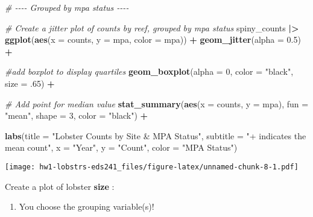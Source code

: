 \documentclass[
]{article}
\newenvironment{Shaded}{\begin{snugshade}}{\end{snugshade}}
\newcommand{\AttributeTok}[1]{\textcolor[rgb]{0.13,0.29,0.53}{#1}}
\newcommand{\CommentTok}[1]{\textcolor[rgb]{0.56,0.35,0.01}{\textit{#1}}}
\newcommand{\DecValTok}[1]{\textcolor[rgb]{0.00,0.00,0.81}{#1}}
\newcommand{\FloatTok}[1]{\textcolor[rgb]{0.00,0.00,0.81}{#1}}
\newcommand{\FunctionTok}[1]{\textcolor[rgb]{0.13,0.29,0.53}{\textbf{#1}}}
\newcommand{\NormalTok}[1]{#1}
\newcommand{\SpecialCharTok}[1]{\textcolor[rgb]{0.81,0.36,0.00}{\textbf{#1}}}
\newcommand{\StringTok}[1]{\textcolor[rgb]{0.31,0.60,0.02}{#1}}
\providecommand{\tightlist}{%
  \setlength{\itemsep}{0pt}\setlength{\parskip}{0pt}}
\begin{document}
\begin{Shaded}
\begin{Highlighting}[]
\CommentTok{\# {-}{-}{-}{-} Grouped by mpa status {-}{-}{-}{-}}

\CommentTok{\# Create a jitter plot of counts by reef, grouped by mpa status}
\NormalTok{spiny\_counts }\SpecialCharTok{|\textgreater{}}
\FunctionTok{ggplot}\NormalTok{(}\FunctionTok{aes}\NormalTok{(}\AttributeTok{x =}\NormalTok{ counts, }\AttributeTok{y =}\NormalTok{ mpa, }\AttributeTok{color =}\NormalTok{ mpa)) }\SpecialCharTok{+}
  \FunctionTok{geom\_jitter}\NormalTok{(}\AttributeTok{alpha =} \FloatTok{0.5}\NormalTok{) }\SpecialCharTok{+} 
    
    \CommentTok{\#add boxplot to display quartiles}
    \FunctionTok{geom\_boxplot}\NormalTok{(}\AttributeTok{alpha =} \DecValTok{0}\NormalTok{, }\AttributeTok{color =} \StringTok{"black"}\NormalTok{, }\AttributeTok{size =}\NormalTok{ .}\DecValTok{65}\NormalTok{) }\SpecialCharTok{+}
    
    \CommentTok{\# Add point for median value}
    \FunctionTok{stat\_summary}\NormalTok{(}\FunctionTok{aes}\NormalTok{(}\AttributeTok{x =}\NormalTok{ counts, }\AttributeTok{y =}\NormalTok{ mpa),}
                 \AttributeTok{fun =} \StringTok{"mean"}\NormalTok{,}
                 \AttributeTok{shape =} \DecValTok{3}\NormalTok{,}
                 \AttributeTok{color =} \StringTok{"black"}\NormalTok{) }\SpecialCharTok{+}
    
    \FunctionTok{labs}\NormalTok{(}\AttributeTok{title =} \StringTok{"Lobster Counts by Site \& MPA Status"}\NormalTok{,}
         \AttributeTok{subtitle =} \StringTok{"+ indicates the mean count"}\NormalTok{,}
         \AttributeTok{x =} \StringTok{"Year"}\NormalTok{,}
         \AttributeTok{y =} \StringTok{"Count"}\NormalTok{,}
         \AttributeTok{color =} \StringTok{"MPA Status"}\NormalTok{)}
\end{Highlighting}
\end{Shaded}

\texttt{[image: hw1-lobstrs-eds241\_files/figure-latex/unnamed-chunk-8-1.pdf]}

Create a plot of lobster \textbf{size} :

\begin{enumerate}
\def\labelenumi{\arabic{enumi})}
\setcounter{enumi}{3}
\tightlist
\item
  You choose the grouping variable(s)!
\end{enumerate}
\end{document}
